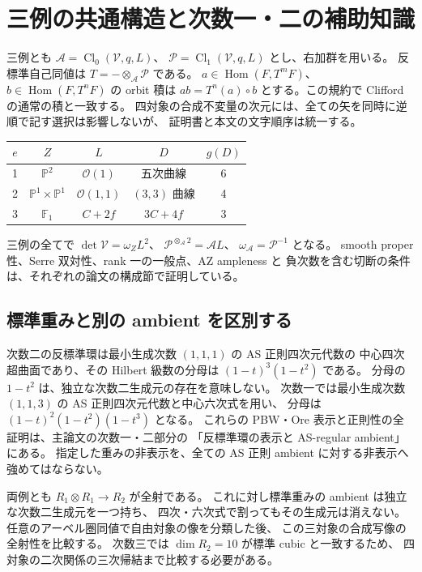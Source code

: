 \documentclass[11pt,a4paper]{ltjsarticle}
\begin{document}
\section{三例の共通構造と次数一・二の補助知識}
三例とも $\mathcal A=\operatorname{Cl}_0(\mathcal V,q,L)$、
$\mathcal P=\operatorname{Cl}_1(\mathcal V,q,L)$ とし、右加群を用いる。
反標準自己同値は $T=-\otimes_{\mathcal A}\mathcal P$ である。
$a\in\operatorname{Hom}(F,T^mF)$、$b\in\operatorname{Hom}(F,T^nF)$ の orbit 積は
$ab=T^n(a)\circ b$ とする。この規約で Clifford の通常の積と一致する。
四対象の合成不変量の次元には、全ての矢を同時に逆順で記す選択は影響しないが、
証明書と本文の文字順序は統一する。

\begin{center}
\begin{tabular}{c|c|c|c|c}
\toprule
$e$ & $Z$ & $L$ & $D$ & $g(D)$\\\midrule
1 & $\mathbb P^2$ & $\mathcal O(1)$ & 五次曲線 & 6\\
2 & $\mathbb P^1\times\mathbb P^1$ & $\mathcal O(1,1)$ & $(3,3)$ 曲線 & 4\\
3 & $\mathbb F_1$ & $C+2f$ & $3C+4f$ & 3\\\bottomrule
\end{tabular}
\end{center}
三例の全てで $\det\mathcal V=\omega_ZL^2$、
$\mathcal P^{\otimes_{\mathcal A}2}=\mathcal A L$、
$\omega_{\mathcal A}=\mathcal P^{-1}$ となる。
smooth proper 性、Serre 双対性、rank 一の一般点、AZ ampleness と
負次数を含む切断の条件は、それぞれの論文の構成節で証明している。

\subsection{標準重みと別の ambient を区別する}
次数二の反標準環は最小生成次数 $(1,1,1)$ の AS 正則四次元代数の
中心四次超曲面であり、その Hilbert 級数の分母は
$(1-t)^3(1-t^2)$ である。
分母の $1-t^2$ は、独立な次数二生成元の存在を意味しない。
次数一では最小生成次数 $(1,1,3)$ の AS 正則四次元代数と中心六次式を用い、
分母は $(1-t)^2(1-t^2)(1-t^3)$ となる。
これらの PBW・Ore 表示と正則性の全証明は、主論文の次数一・二部分の
「反標準環の表示と AS-regular ambient」にある。
指定した重みの非表示を、全ての AS 正則 ambient に対する非表示へ強めてはならない。

両例とも $R_1\otimes R_1\to R_2$ が全射である。
これに対し標準重みの ambient は独立な次数二生成元を一つ持ち、
四次・六次式で割ってもその生成元は消えない。
任意のアーベル圏同値で自由対象の像を分類した後、
この三対象の合成写像の全射性を比較する。
次数三では $\dim R_2=10$ が標準 cubic と一致するため、
四対象の二次関係の三次帰結まで比較する必要がある。
\end{document}
